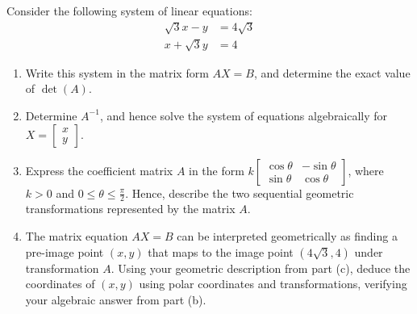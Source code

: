 \begin{problem}
Consider the following system of linear equations:
\begin{align*}
\sqrt{3}x - y &= 4\sqrt{3} \\
x + \sqrt{3}y &= 4
\end{align*}

\begin{enumerate}[label=\textbf{(\alph*)}]
    \item Write this system in the matrix form $AX = B$, and determine the exact value of $\det(A)$.
    \item Determine $A^{-1}$, and hence solve the system of equations algebraically for $X = \begin{bmatrix} x \\ y \end{bmatrix}$.
    \item Express the coefficient matrix $A$ in the form $k \begin{bmatrix} \cos\theta & -\sin\theta \\ \sin\theta & \cos\theta \end{bmatrix}$, where $k > 0$ and $0 \le \theta \le \frac{\pi}{2}$. Hence, describe the two sequential geometric transformations represented by the matrix $A$.
    \item The matrix equation $AX = B$ can be interpreted geometrically as finding a pre-image point $(x, y)$ that maps to the image point $(4\sqrt{3}, 4)$ under transformation $A$. Using your geometric description from part (c), deduce the coordinates of $(x, y)$ using polar coordinates and transformations, verifying your algebraic answer from part (b).
\end{enumerate}
\end{problem}

